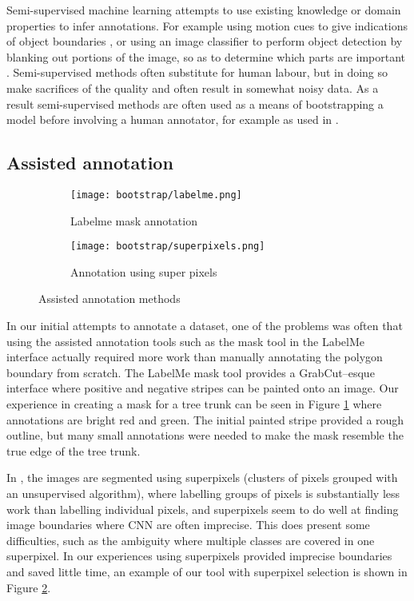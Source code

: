 Semi-supervised machine learning attempts to use existing knowledge or domain properties to infer annotations. For example using motion cues to give indications of object boundaries \cite{Hong2017}, or using an image classifier to perform object detection by blanking out portions of the image, so as to determine which parts are important \cite{Bazzani2016}. Semi-supervised methods often substitute for human labour, but in doing so make sacrifices of the quality and often result in somewhat noisy data. As a result semi-supervised methods are often used as a means of bootstrapping a model before involving a human annotator, for example as used in \cite{Papadopoulos2016}.


\subsection {Assisted annotation}


\begin{figure}[h]
\centering
\begin{subfigure}{.25\textwidth}
  \centering
  \texttt{[image: bootstrap/labelme.png]}
  \caption{Labelme mask annotation}  
  \label{fig:labelme}
\end{subfigure}%
\begin{subfigure}{.25\textwidth}
  \centering
  \texttt{[image: bootstrap/superpixels.png]}
  \caption{Annotation using super pixels}
  \label{fig:superpixels}
\end{subfigure}

\caption{Assisted annotation methods}
\label{fig:annot_method}
\end{figure}


In our initial attempts to annotate a dataset, one of the problems was often that using the assisted annotation tools such as the mask tool in the LabelMe \cite{Russell2007} interface actually required more work than manually annotating the polygon boundary from scratch. The LabelMe mask tool provides a GrabCut--esque interface where positive and negative stripes can be painted onto an image. Our experience in creating a mask for a tree trunk can be seen in Figure \ref{fig:labelme} where annotations are bright red and green. The initial painted stripe provided a rough outline, but many small annotations were needed to make the mask resemble the true edge of the tree trunk.

In \cite{Galloway2017}, the images are segmented using superpixels (clusters of pixels grouped with an unsupervised algorithm), where labelling groups of pixels is substantially less work than labelling individual pixels, and superpixels seem to do well at finding image boundaries where \gls{CNN} are often imprecise. This does present some difficulties, such as the ambiguity where multiple classes are covered in one superpixel. In our experiences using superpixels provided imprecise boundaries and saved little time, an example of our tool with superpixel selection is shown in Figure \ref{fig:superpixels}.

